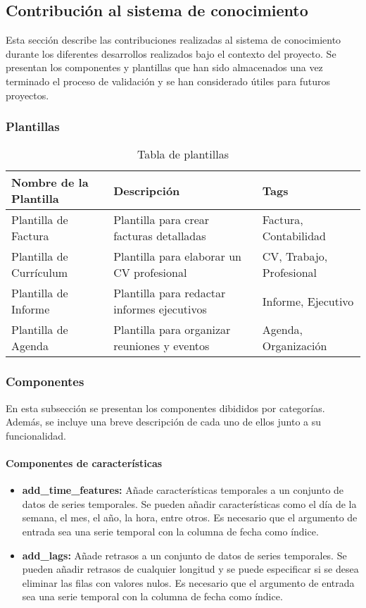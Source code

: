 \subsection{Contribución al sistema de conocimiento}
Esta sección describe las contribuciones realizadas al sistema de conocimiento
durante los diferentes desarrollos realizados bajo el contexto del proyecto. 
Se presentan los componentes y plantillas que han sido almacenados una vez
terminado el proceso de validación y se han considerado útiles para futuros
proyectos.

\subsubsection{Plantillas}
\begin{table}[h!]
    \centering
    \begin{tabular}{| m{4cm} | m{5cm} | m{3cm} |}
      \hline
      \textbf{Nombre de la Plantilla} & \textbf{Descripción} & \textbf{Tags} \\ 
      \hline
      Plantilla de Factura & Plantilla para crear facturas detalladas & Factura, Contabilidad \\ 
      \hline
      Plantilla de Currículum & Plantilla para elaborar un CV profesional & CV, Trabajo, Profesional \\ 
      \hline
      Plantilla de Informe & Plantilla para redactar informes ejecutivos & Informe, Ejecutivo \\ 
      \hline
      Plantilla de Agenda & Plantilla para organizar reuniones y eventos & Agenda, Organización \\ 
      \hline
    \end{tabular}
    \caption{Tabla de plantillas}
    \label{table:templates}
\end{table}

\subsubsection{Componentes}
En esta subsección se presentan los componentes dibididos por categorías.
Además, se incluye una breve descripción de cada uno de ellos junto a su funcionalidad.

\paragraph{Componentes de características}
\begin{itemize}
    \item \textbf{add\_time\_features:} Añade características temporales a un conjunto de datos
    de series temporales. Se pueden añadir características como el día de la semana, el mes, el año,
    la hora, entre otros. Es necesario que el argumento de entrada sea una serie temporal con la
    columna de fecha como índice.
    \item \textbf{add\_lags:} Añade retrasos a un conjunto de datos de series temporales. Se pueden
    añadir retrasos de cualquier longitud y se puede especificar si se desea eliminar las filas con
    valores nulos. Es necesario que el argumento de entrada sea una serie temporal con la columna de
    fecha como índice.
\end{itemize}


